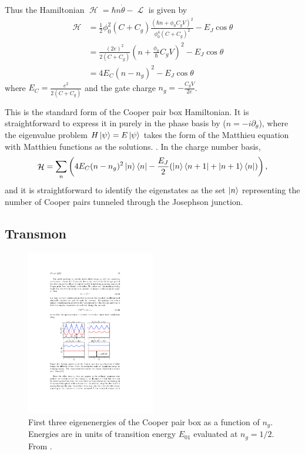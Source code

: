 \documentclass[11pt]{article}
\DeclareMathOperator{\lagr}{\mathcal{L}}
\DeclareMathOperator{\ham}{\mathcal{H}}
\begin{document}
Thus the Hamiltonian $\ham = \hbar n \dot{\theta} - \lagr$ is given by
\begin{align}
\ham 
&= \frac{1}{2} \phi_0^2 (C + C_g) \frac{\left(\hbar n + \phi_0 C_g V\right)^2}{\phi_0^4 (C + C_g)^2} - E_J \cos{\theta} \\
&= \frac{(2e)^2}{2 (C + C_g)} \left(n + \frac{\phi_0}{\hbar} C_g V\right)^2 - E_J \cos{\theta} \\
&= 4 E_C (n - n_g)^2 - E_J \cos{\theta}
\end{align}
where $E_C = \frac{e^2}{2 (C + C_g)}$ and the gate charge $n_g = - \frac{C_g V}{2e}$. 

This is the standard form of the Cooper pair box Hamiltonian. It is straightforward to express it in purely in the phase basis by ($n=-i\partial_\theta$), where the eigenvalue problem $H \ket{\psi} = E \ket{\psi}$ takes the form of the Matthieu equation with Matthieu functions as the solutions. \cite{girvin2011superconducting}. In the charge number basis,
\begin{equation}
\ham = \sum_n \left(4 E_C (n - n_g)^2 \ket{n} \bra{n} - \frac{E_J}{2} (\ket{n} \bra{n+1} + \ket{n+1} \bra{n})\right),
\end{equation}
and it is straightforward to identify the eigenstates as the set $\ket{n}$ representing the number of Cooper pairs tunneled through the Josephson junction.




\subsection{Transmon}

\begin{figure}[H]
	\centering
	\includegraphics[width=0.5\textwidth]{cpb_energies.pdf}
	\caption{First three eigenenergies of the Cooper pair box as a function of $n_g$. Energies are in units of transition energy $E_{01}$ evaluated at $n_g=1/2$. From \cite{koch2007charge}.}
	\label{fig_cpbenergies}
\end{figure}
\end{document}
